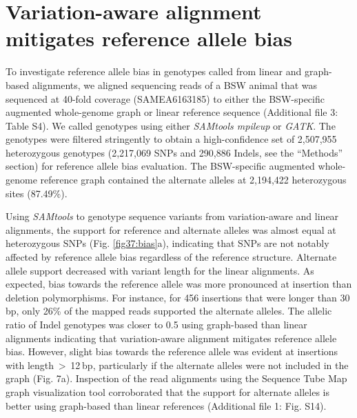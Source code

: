 \documentclass[../main.tex]{subfiles}
\begin{document}
\section*{Variation-aware alignment mitigates reference allele bias}

To investigate reference allele bias in genotypes called from linear and graph-based alignments, we aligned sequencing reads of a BSW animal that was sequenced at 40-fold coverage (SAMEA6163185) to either the BSW-specific augmented whole-genome graph or linear reference sequence (Additional file 3: Table S4). We called genotypes using either \emph{SAMtools mpileup} or \emph{GATK}. The genotypes were filtered stringently to obtain a high-confidence set of 2,507,955 heterozygous genotypes (2,217,069 SNPs and 290,886 Indels, see the “Methods” section) for reference allele bias evaluation. The BSW-specific augmented whole-genome reference graph contained the alternate alleles at 2,194,422 heterozygous sites (87.49\%).

Using \emph{SAMtools} to genotype sequence variants from variation-aware and linear alignments, the support for reference and alternate alleles was almost equal at heterozygous SNPs (Fig. \ref{fig37:bias}a), indicating that SNPs are not notably affected by reference allele bias regardless of the reference structure. Alternate allele support decreased with variant length for the linear alignments. As expected, bias towards the reference allele was more pronounced at insertion than deletion polymorphisms. For instance, for 456 insertions that were longer than 30 bp, only 26\% of the mapped reads supported the alternate alleles. The allelic ratio of Indel genotypes was closer to 0.5 using graph-based than linear alignments indicating that variation-aware alignment mitigates reference allele bias. However, slight bias towards the reference allele was evident at insertions with length $>$ 12 bp, particularly if the alternate alleles were not included in the graph (Fig. 7a). Inspection of the read alignments using the Sequence Tube Map graph visualization tool \citep{beyer2019sequence} corroborated that the support for alternate alleles is better using graph-based than linear references (Additional file 1: Fig. S14).
\end{document}
